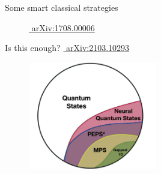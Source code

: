 \documentclass[aspectratio=169, 8pt, xcolor={svgnames}, hyperref={linkcolor=black}]{beamer}
\begin{document}
\begin{frame}{Some smart classical strategies}
\begin{multicols}{3}
\begin{figure}
{      \caption*{\href{https://arxiv.org/abs/1708.00006}{\faBook\,\,arXiv:1708.00006}}}%
   \end{figure}
   \end{multicols}
\end{frame}

\begin{frame}{Is this enough? \hfill \href{https://arxiv.org/abs/2103.10293}{\faBook\,\,arXiv:2103.10293}}
\pause
\begin{figure}
   \includegraphics[width=0.5\textwidth]{figures/complexity.jpg}
\end{figure}
\end{frame}
\end{document}
